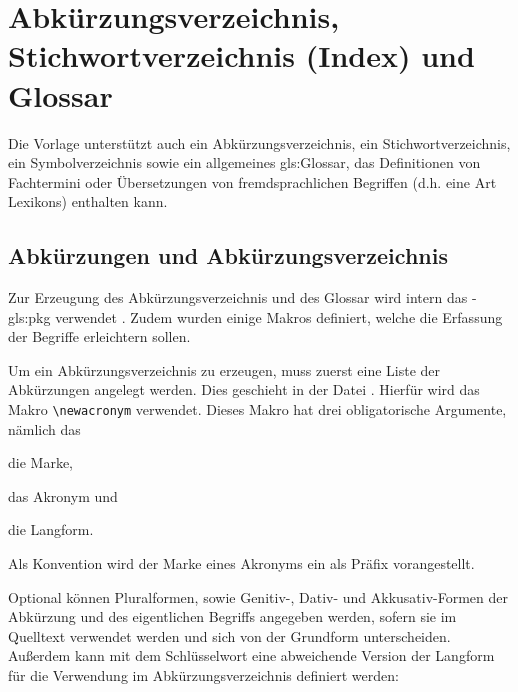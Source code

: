 \section{Abkürzungsverzeichnis, Stichwortverzeichnis (Index) und Glossar}%
%
%
%
%
\label{sec:Glossare}
%
Die Vorlage unterstützt auch ein Abkürzungsverzeichnis, ein Stichwortverzeichnis,
ein Symbolverzeichnis sowie ein allgemeines \gls{gls:Glossar},
das Definitionen von Fachtermini oder
Übersetzungen von fremdsprachlichen Begriffen
(d.h. eine Art Lexikons) enthalten kann.


\subsection{Abkürzungen und Abkürzungsverzeichnis}%
%
%
\label{sec:Akronyme}
Zur Erzeugung des Abkürzungsverzeichnis und des Glossar wird intern das
-\gls{gls:pkg} verwendet \cite{talbot2014}.
Zudem wurden einige Makros definiert, welche die Erfassung der Begriffe erleichtern sollen.

Um ein Abkürzungsverzeichnis zu erzeugen, muss zuerst eine Liste der Abkürzungen angelegt werden.
Dies geschieht in der Datei .
Hierfür wird das Makro \lstinline|\newacronym| verwendet.
Dieses Makro hat drei obligatorische Argumente, nämlich das
\begin{itemize*}
\item die Marke,
\item das Akronym und
\item die Langform.
\end{itemize*}

Als Konvention wird der Marke eines Akronyms ein  als Präfix vorangestellt.

\begin{latex}[caption={Definition einer Abkürzung},label={lst:SimpleAcronymEntry}]
\end{latex}

Optional können Pluralformen, sowie Genitiv-, Dativ- und Akkusativ-Formen 
der Abkürzung und des eigentlichen Begriffs angegeben werden,
sofern sie im Quelltext verwendet werden und sich von der Grundform unterscheiden.
Außerdem kann mit dem Schlüsselwort 
eine abweichende Version der Langform für die Verwendung im Abkürzungsverzeichnis definiert werden:

